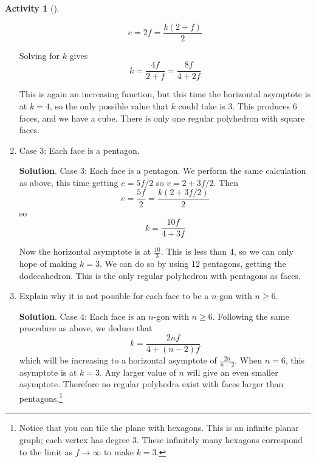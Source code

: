 \documentclass[10pt,]{book}
\theoremstyle{plain}
\theoremstyle{definition}
\theoremstyle{definition}
\theoremstyle{definition}
\newtheorem{activity}[project]{Activity}
\numberwithin{equation}{chapter}
\begin{document}
\begin{activity}[]
\begin{enumerate}[font=\bfseries,label=(\alph*),ref=\alph*]
\begin{equation*}
e = 2f = \frac{k(2+f)}{2}
\end{equation*}
%
\par
\hypertarget{p-325}{}%
Solving for \(k\) gives%
\begin{equation*}
k = \frac{4f}{2+f} = \frac{8f}{4+2f}
\end{equation*}
%
\par
\hypertarget{p-326}{}%
This is again an increasing function, but this time the horizontal asymptote is at \(k = 4\), so the only possible value that \(k\) could take is 3. This produces 6 faces, and we have a cube. There is only one regular polyhedron with square faces.%
\item\label{task-46} \hypertarget{p-327}{}%
Case 3: Each face is a pentagon.%
\par\smallskip%
\noindent\textbf{Solution}.\hypertarget{solution-23}{}\quad%
\hypertarget{p-328}{}%
Case 3: Each face is a pentagon. We perform the same calculation as above, this time getting \(e = 5f/2\) so \(v = 2 + 3f/2\). Then%
\begin{equation*}
e = \frac{5f}{2} = \frac{k(2+3f/2)}{2}
\end{equation*}
so%
\begin{equation*}
k = \frac{10f}{4+3f}
\end{equation*}
%
\par
\hypertarget{p-329}{}%
Now the horizontal asymptote is at \(\frac{10}{3}\). This is less than 4, so we can only hope of making \(k = 3\). We can do so by using 12 pentagons, getting the dodecahedron. This is the only regular polyhedron with pentagons as faces.%
\item\label{task-47} \hypertarget{p-330}{}%
Explain why it is not possible for each face to be a \(n\)-gon with \(n \ge 6\).%
\par\smallskip%
\noindent\textbf{Solution}.\hypertarget{solution-24}{}\quad%
\hypertarget{p-331}{}%
Case 4: Each face is an \(n\)-gon with \(n \ge 6\). Following the same procedure as above, we deduce that%
\begin{equation*}
k = \frac{2nf}{4+(n-2)f}
\end{equation*}
which will be increasing to a horizontal asymptote of \(\frac{2n}{n-2}\). When \(n = 6\), this asymptote is at \(k = 3\). Any larger value of \(n\) will give an even smaller asymptote. Therefore no regular polyhedra exist with faces larger than pentagons.\footnote{Notice that you can tile the plane with hexagons.  This is an infinite planar graph; each vertex has degree 3.  These infinitely many hexagons correspond to the limit as \(f \to \infty\) to make \(k = 3\).\label{fn-4}}%
\end{enumerate}
\end{activity}
\typeout{************************************************}
\typeout{************************************************}
\end{document}
